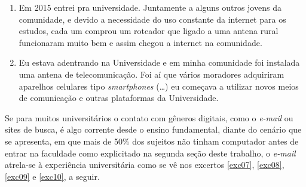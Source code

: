 \documentclass{textolivre}
\begin{document}

\begin{enumerate}[resume,label={(\arabic*)},ref={\arabic*},topsep=1ex,partopsep=1ex]
    \item\label{exc05} Em 2015 entrei pra universidade. Juntamente a alguns outros jovens da comunidade, e devido a necessidade do uso constante da internet para os estudos, cada um comprou um roteador que ligado a uma antena rural funcionaram muito bem e assim chegou a internet na comunidade.
    \item\label{exc06} Eu estava adentrando na Universidade e em minha comunidade foi instalada uma antena de telecomunicação. Foi aí que vários moradores adquiriram aparelhos celulares tipo \textit{smartphones} (\ldots) eu começava a utilizar novos meios de comunicação e outras plataformas da Universidade.
\end{enumerate}

Se para muitos universitários o contato com gêneros digitais, como o \textit{e-mail} ou sites de busca, é algo corrente desde o ensino fundamental, diante do cenário que se apresenta, em que mais de 50\% dos sujeitos não tinham computador antes de entrar na faculdade como explicitado na segunda seção deste trabalho, o \textit{e-mail} atrela-se à experiência universitária como se vê nos excertos \ref{exc07}, \ref{exc08}, \ref{exc09} e \ref{exc10}, a seguir.
\end{document}
